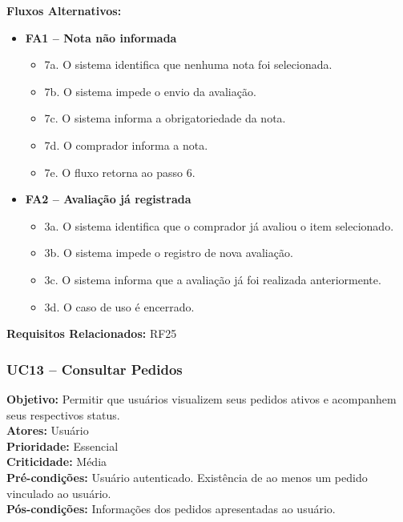 \documentclass[
	article,			%
	11pt,				%
	oneside,			%
	a4paper,			%
	english,			%
	brazil,				%
	sumario=tradicional
	]{abntex2}
\begin{document}
\vspace{0.5em}
\noindent\textbf{Fluxos Alternativos:}
\begin{itemize}[leftmargin=*]
    \item \textbf{FA1 – Nota não informada}
    \begin{itemize}[label={}, leftmargin=0.5cm]
        \item 7a. O sistema identifica que nenhuma nota foi selecionada.
        \item 7b. O sistema impede o envio da avaliação.
        \item 7c. O sistema informa a obrigatoriedade da nota.
        \item 7d. O comprador informa a nota.
        \item 7e. O fluxo retorna ao passo 6.
    \end{itemize}
    
    \item \textbf{FA2 – Avaliação já registrada}
    \begin{itemize}[label={}, leftmargin=0.5cm]
        \item 3a. O sistema identifica que o comprador já avaliou o item selecionado.
        \item 3b. O sistema impede o registro de nova avaliação.
        \item 3c. O sistema informa que a avaliação já foi realizada anteriormente.
        \item 3d. O caso de uso é encerrado.
    \end{itemize}
\end{itemize}

\vspace{0.5em}
\noindent\textbf{Requisitos Relacionados:} RF25


\subsubsection{UC13 – Consultar Pedidos}
\label{uc:13}
\noindent\textbf{Objetivo:} Permitir que usuários visualizem seus pedidos ativos e acompanhem seus respectivos status.\\
\textbf{Atores:} Usuário\\
\textbf{Prioridade:} Essencial\\
\textbf{Criticidade:} Média\\
\textbf{Pré-condições:} Usuário autenticado. Existência de ao menos um pedido vinculado ao usuário.\\
\textbf{Pós-condições:} Informações dos pedidos apresentadas ao usuário.
\end{document}
